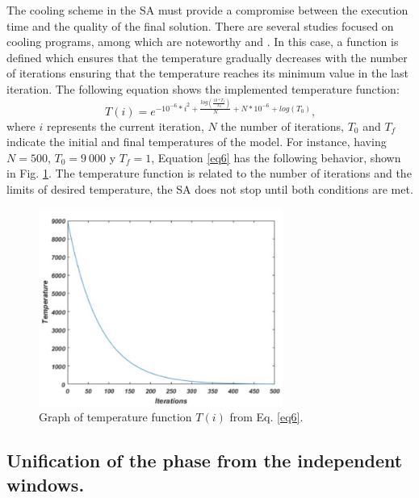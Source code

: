 \documentclass[review]{elsarticle}
\begin{document}
The cooling scheme in the SA must provide a compromise between the execution time and the quality of the final solution. There are several studies focused on cooling programs, among which are noteworthy \cite{cardoso1994nonequilibrium} and \cite{nourani1998comparison}. In this case, a function is defined which ensures that the temperature gradually decreases with the number of iterations ensuring that the temperature reaches its minimum value in the last iteration. The following equation shows the implemented temperature function:
\begin{equation}\label{eq6}
T(i) = e^{-10^{-6}*i^2 + \frac{log(\frac{10*T_{f}}{T_{0}})}{N} + N*10^{-6} + log(T_{0}) } \text{,}
\end{equation}
where $i$ represents the current iteration, $N$ the number of iterations, $T_{0}$ and $T_{f}$ indicate the initial and final temperatures of the model. For instance, having  $N = 500$, $T_{0} = 9\ 000$ y $T_{f} = 1$, Equation \ref{eq6} has the following behavior, shown in Fig. \ref{Fig2}. The temperature function is related to the number of iterations and the limits of desired temperature, the SA does not stop until both conditions are met.
\begin{figure}[ht]
\centering\includegraphics[width=8cm]{fig2}
\caption{Graph of temperature function $T(i)$ from Eq. \ref{eq6}.}
\label{Fig2}
\end{figure}

\subsection{Unification of the phase from the independent windows.}
\end{document}
